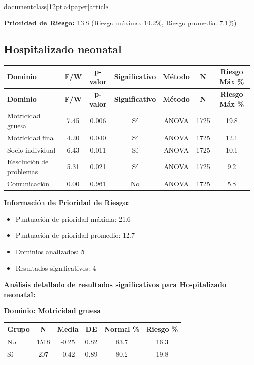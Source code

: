 \\documentclass[12pt,a4paper]{article}
\begin{document}
\textbf{Prioridad de Riesgo:} 13.8 (Riesgo máximo: 10.2\%, Riesgo promedio: 7.1\%)


\vspace{0.5cm}


\subsection{Hospitalizado neonatal}


\begin{longtable}{|l|c|c|c|c|c|c|}
\hline
\textbf{Dominio} & \textbf{F/W} & \textbf{p-valor} & \textbf{Significativo} & \textbf{Método} & \textbf{N} & \textbf{Riesgo Máx \%} \\
\hline
\endfirsthead

\hline
\textbf{Dominio} & \textbf{F/W} & \textbf{p-valor} & \textbf{Significativo} & \textbf{Método} & \textbf{N} & \textbf{Riesgo Máx \%} \\
\hline
\endhead

\hline
\endfoot

\hline
\endlastfoot

Motricidad gruesa & 7.45 & 0.006 & Sí & ANOVA & 1725 & 19.8 \\
Motricidad fina & 4.20 & 0.040 & Sí & ANOVA & 1725 & 12.1 \\
Socio-individual & 6.43 & 0.011 & Sí & ANOVA & 1725 & 10.1 \\
Resolución de problemas & 5.31 & 0.021 & Sí & ANOVA & 1725 & 9.2 \\
Comunicación & 0.00 & 0.961 & No & ANOVA & 1725 & 5.8 \\

\end{longtable}


\textbf{Información de Prioridad de Riesgo:}
\begin{itemize}
\item Puntuación de prioridad máxima: 21.6
\item Puntuación de prioridad promedio: 12.7
\item Dominios analizados: 5
\item Resultados significativos: 4
\end{itemize}


\textbf{Análisis detallado de resultados significativos para Hospitalizado neonatal:}


\textbf{Dominio: Motricidad gruesa}


\begin{center}
\begin{tabular}{|l|c|c|c|c|c|}
\hline
\textbf{Grupo} & \textbf{N} & \textbf{Media} & \textbf{DE} & \textbf{Normal \%} & \textbf{Riesgo \%} \\
\hline
No & 1518 & -0.25 & 0.82 & 83.7 & 16.3 \\
Sí & 207 & -0.42 & 0.89 & 80.2 & 19.8 \\

\hline
\end{tabular}
\end{center}
\end{document}
